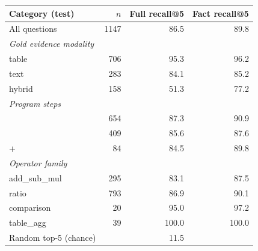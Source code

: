 \begin{tabular}{lrrr}
\toprule
Category (test) & $n$ & Full recall@5 & Fact recall@5 \\
\midrule
All questions & 1147 & 86.5 & 89.8 \\
\midrule
\multicolumn{4}{l}{\emph{Gold evidence modality}} \\
\quad table & 706 & 95.3 & 96.2 \\
\quad text & 283 & 84.1 & 85.2 \\
\quad hybrid & 158 & 51.3 & 77.2 \\
\multicolumn{4}{l}{\emph{Program steps}} \\
\quad 1 & 654 & 87.3 & 90.9 \\
\quad 2 & 409 & 85.6 & 87.6 \\
\quad 3+ & 84 & 84.5 & 89.8 \\
\multicolumn{4}{l}{\emph{Operator family}} \\
\quad add\_sub\_mul & 295 & 83.1 & 87.5 \\
\quad ratio & 793 & 86.9 & 90.1 \\
\quad comparison & 20 & 95.0 & 97.2 \\
\quad table\_agg & 39 & 100.0 & 100.0 \\
\midrule
Random top-5 (chance) & & 11.5 & \\
\bottomrule
\end{tabular}
